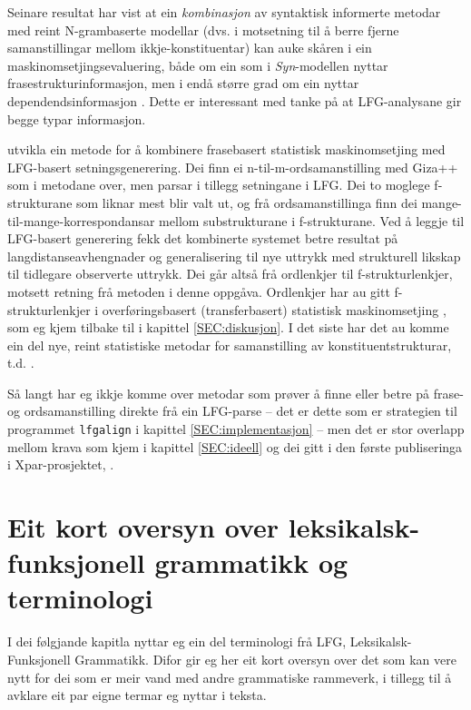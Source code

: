 \documentclass[12pt,a4paper,oneside,draft]{report}
\begin{document}
Seinare resultat har vist at ein \emph{kombinasjon} av syntaktisk
 informerte metodar med reint N-grambaserte modellar (dvs. i
 motsetning til å berre fjerne samanstillingar mellom
 ikkje\hyp{}konstituentar) kan auke skåren i ein
 maskinomsetjingsevaluering, både om ein som i \emph{Syn}-modellen nyttar
 frasestrukturinformasjon, men i endå større grad om ein nyttar
 dependendsinformasjon \citep{tinsley2007ept,hearne2008ccd}. Dette er
 interessant med tanke på at LFG-analysane gir begge typar
 informasjon.

\citet{riezler2006gmt} utvikla ein metode for å kombinere frasebasert
 statistisk maskinomsetjing med LFG-basert setningsgenerering. Dei
 finn ei n-til-m-ordsamanstilling med Giza++ som i metodane over, men
 parsar i tillegg setningane i LFG. Dei to moglege f\hyp{}strukturane
 som liknar mest blir valt ut, og frå ordsamanstillinga finn dei
 mange-til-mange-korrespondansar mellom substrukturane i
 f\hyp{}strukturane. Ved å leggje til LFG-basert generering fekk det
 kombinerte systemet betre resultat på langdistanseavhengnader og
 generalisering til nye uttrykk med strukturell likskap til tidlegare
 observerte uttrykk. Dei går altså frå ordlenkjer til
 f\hyp{}strukturlenkjer, motsett retning frå metoden i denne
 oppgåva. Ordlenkjer har au gitt f\hyp{}strukturlenkjer i
 overføringsbasert (transferbasert) statistisk maskinomsetjing
 \citep{graham2010dsl,graham2009osr,graham2009fts}, som eg kjem
 tilbake til i kapittel \ref{SEC:diskusjon}. I det siste har det au
 komme ein del nye, reint statistiske metodar for samanstilling av
 konstituentstrukturar, t.d. \citet{zhechev2008agp,tiedemann2009dat}.

Så langt har eg ikkje komme over metodar som prøver å finne eller
 betre på frase- og ordsamanstilling direkte frå ein LFG-parse -- det
 er dette som er strategien til programmet \texttt{lfgalign} i kapittel
 \ref{SEC:implementasjon} -- men det er stor overlapp mellom krava som
 kjem i kapittel \ref{SEC:ideell} 
 \citep[i tillegg nemnt i][]{unhammer2010lcf}
 og dei gitt i den første publiseringa i
 Xpar-prosjektet, \citet{dyvik2009lmp}.

\section{Eit kort oversyn over leksikalsk-funksjonell grammatikk og terminologi}
\label{sec-2.2}

 \label{SEC:omgrepsavklaring}

 I dei følgjande kapitla nyttar eg ein del terminologi frå LFG,
 Leksikalsk-Funksjonell Grammatikk. Difor gir eg her eit kort oversyn
 over det som kan vere nytt for dei som er meir vand med andre
 grammatiske rammeverk, i tillegg til å avklare eit par eigne termar
 eg nyttar i teksta.
\end{document}
